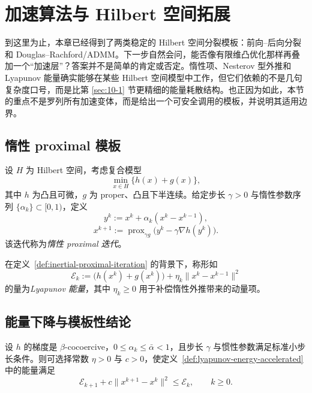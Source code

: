 \section{加速算法与 Hilbert 空间拓展}

\label{sec:10-4}

到这里为止，本章已经得到了两类稳定的 Hilbert 空间分裂模板：前向--后向分裂和 Douglas--Rachford/ADMM。下一步自然会问，能否像有限维凸优化那样再叠加一个“加速层”？答案并不是简单的肯定或否定。惰性项、Nesterov 型外推和 Lyapunov 能量确实能够在某些 Hilbert 空间模型中工作，但它们依赖的不是几句复杂度口号，而是比第 \ref{sec:10-1} 节更精细的能量耗散结构。也正因为如此，本节的重点不是罗列所有加速变体，而是给出一个可安全调用的模板，并说明其适用边界。

\subsection{惰性 proximal 模板}

\begin{definition}[惰性 proximal 迭代]\label{def:inertial-proximal-iteration}
设 $H$ 为 Hilbert 空间，考虑复合模型
\[
\min_{x\in H}\{h(x)+g(x)\},
\]
其中 $h$ 为凸且可微，$g$ 为 proper、凸且下半连续。给定步长 $\gamma>0$ 与惰性参数序列 $\{\alpha_k\}\subset [0,1)$，定义
\[
y^k:=x^k+\alpha_k(x^k-x^{k-1}),
\]
\[
x^{k+1}:=\operatorname{prox}_{\gamma g}\bigl(y^k-\gamma \nabla h(y^k)\bigr).
\]
该迭代称为\emph{惰性 proximal 迭代}。
\end{definition}

\begin{definition}\label{def:lyapunov-energy-accelerated}
在定义~\ref{def:inertial-proximal-iteration} 的背景下，称形如
\[
\mathcal E_k:=\bigl(h(x^k)+g(x^k)\bigr)+\eta_k\|x^k-x^{k-1}\|^2
\]
的量为\emph{Lyapunov 能量}，其中 $\eta_k\ge 0$ 用于补偿惰性外推带来的动量项。
\end{definition}

\subsection{能量下降与模板性结论}

\begin{proposition}[加速迭代的能量下降]\label{prop:accelerated-energy-descent}
设 $h$ 的梯度是 $\beta$-cocoercive，$0\le \alpha_k\le \bar\alpha<1$，且步长 $\gamma$ 与惯性参数满足标准小步长条件。则可选择常数 $\eta>0$ 与 $c>0$，使定义~\ref{def:lyapunov-energy-accelerated} 中的能量满足
\[
\mathcal E_{k+1}+c\|x^{k+1}-x^k\|^2\le \mathcal E_k,
\qquad k\ge 0.
\]
\end{proposition}

